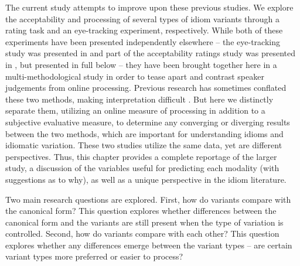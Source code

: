 \documentclass[output=paper,modfonts,nonflat]{langsci/langscibook}
\begin{document}
The current study attempts to improve upon these previous studies. We explore the acceptability and processing of several types of idiom variants through a rating task and an eye-tracking experiment, respectively. While both of these experiments have been presented independently elsewhere -- the eye-tracking study was presented in \citet{GeeraertEtAl2017b} and part of the acceptability ratings study was presented in \citet{GeeraertEtAl2017}, but presented in full below -- they have been brought together here in a multi-methodological study  in order to tease apart and contrast speaker judgements from online processing. Previous research has sometimes conflated these two methods, making interpretation difficult \citep[cf.][]{GibbsEtAl1989, GibbsNayak1989}. But here we distinctly separate them, utilizing an online measure of processing in addition to a subjective evaluative measure, to determine any converging or diverging results between the two methods, which are important for understanding idioms and idiomatic variation. These two studies utilize the same data, yet are different perspectives. Thus, this chapter provides a complete reportage of the larger study, a discussion of the variables useful for predicting each modality (with suggestions as to why), as well as a unique perspective in the idiom literature.

Two main research questions are explored. First, how do variants compare with the canonical form? This question explores whether differences between the canonical form and the variants are still present when the type of variation is controlled. Second, how do variants compare with each other? This question explores whether any differences emerge between the variant types -- are certain variant types more preferred or easier to process?
\end{document}
